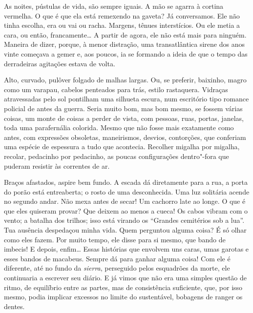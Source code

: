 \pagebreak
\thispagestyle{empty}
\movetooddpage
\thispagestyle{empty}
\begin{vplace}[0.25]


{\large{}}
\end{vplace}

\pagebreak
\thispagestyle{empty}

\movetooddpage

As noites, pústulas de vida, são sempre iguais. A mão se agarra à
cortina vermelha. O que é que ela está remexendo na gaveta? Já
conversamos. Ele não tinha escolha, era ou vai ou racha. Margens, tênues
interstícios. Ou ele metia a cara, ou então, francamente\ldots{} A partir de
agora, ele não está mais para ninguém. Maneira de dizer, porque, à menor
distração, uma transatlântica sirene dos anos vinte começava a gemer e,
aos poucos, ia se formando a ideia de que o tempo das derradeiras
agitações estava de volta.

Alto, curvado, pulôver folgado de malhas largas. Ou, se preferir,
baixinho, magro como um varapau, cabelos penteados para trás, estilo
rastaquera. Vidraças atravessadas pelo sol pontilham uma silhueta
escura, num escritório tipo romance policial de antes da guerra. Seria
muito bom, mas bom mesmo, se fossem várias coisas, um monte de coisas a
perder de vista, com pessoas, ruas, portas, janelas, toda uma
parafernália colorida. Mesmo que não fosse mais exatamente como antes,
com expressões obsoletas, maneirismos, desvios, contorções, que
conferiam uma espécie de espessura a tudo que acontecia. Recolher
migalha por migalha, recolar, pedacinho por pedacinho, as poucas
configurações dentro"-fora que puderam resistir às correntes de ar.

Braços afastados, aspire bem fundo. A escada dá diretamente para a rua,
a porta do porão está entreaberta; o rosto de uma desconhecida. Uma luz
solitária acende no segundo andar. Não mexa antes de secar! Um cachorro
late ao longe. O que é que eles quiseram provar? Que deixem ao menos a
cueca! Os cabos vibram com o vento; a batalha dos trilhos; isso está
virando os ``Grandes cemitérios sob a lua''. Tua ausência despedaçou
minha vida. Quem perguntou alguma coisa? É só olhar como eles fazem. Por
muito tempo, ele disse para si mesmo, que bando de imbecis! E depois,
enfim\ldots{} Essas histórias que envolvem uns caras, umas garotas e esses
bandos de macabeus. Sempre dá para ganhar alguma coisa! Com ele é
diferente, até no fundo da \emph{sierra}, perseguido pelos esquadrões da
morte, ele continuaria a escrever seu diário. E já vimos que não era uma
simples questão de ritmo, de equilíbrio entre as partes, mas de
consistência suficiente, que, por isso mesmo, podia implicar excessos no
limite do sustentável, bobagens de ranger os dentes.

